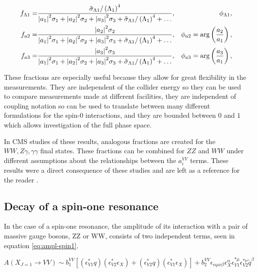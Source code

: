 \begin{equation}\begin{aligned}
f_{\Lambda1} =& \frac{\tilde{\sigma}_{\Lambda1}/\left(\Lambda_{1}\right)^{4}}{\abs{a_1}^2 \sigma_{1} + \abs{a_2}^2 \sigma_{2} + \abs{a_3}^2 \sigma_{3} + \tilde{\sigma}_{\Lambda{1}}/\left(\Lambda_{1}\right)^{4} +\ldots}, &\phi_{\Lambda1}, \\
f_{a2} =& \frac{\abs{a_2}^2 \sigma_{2}}{\abs{a_1}^2 \sigma_{1} + \abs{a_2}^2 \sigma_{2} + \abs{a_3}^2 \sigma_{3} + \tilde{\sigma}_{\Lambda{1}}/\left(\Lambda_{1}\right)^{4} +\ldots}, &\phi_{a2} = \text{arg}\left(\frac{a_{2}}{a_{1}}\right), \\
f_{a3} =& \frac{\abs{a_3}^2 \sigma_{3}}{\abs{a_1}^2 \sigma_{1} + \abs{a_2}^2 \sigma_{2} + \abs{a_3}^2 \sigma_{3} + \tilde{\sigma}_{\Lambda{1}}/\left(\Lambda_{1}\right)^{4} +\ldots}, &\phi_{a3} = \text{arg}\left(\frac{a_{3}}{a_{1}}\right),
\label{eq:fa_definitions}
\end{aligned}\end{equation}


These fractions are especially useful because they allow for great flexibility in the measurements. They are independent of the collider energy so they can be used to compare measurements made at different facilities, they are independent of coupling notation so can be used to translate between many different formulations for the spin-0 interactions, and they are bounded between $0$ and $1$ which allows investigation of the full phase space. 

In CMS studies of these results, analogous fractions are created for the $WW, Z\gamma, \gamma\gamma$ final states. These fractions can be combined for $ZZ$ and $WW$ under different assumptions about the relationships between the $a_{i}^{VV}$ terms. These results were a direct consequence of these studies and are left as a reference for the reader \cite{Khachatryan:2014kca}. 

\subsection{Decay of a spin-one resonance}
\label{sec:Spin1_Pheno}

In the case of a spin-one resonance, the amplitude of its interaction with a pair of massive gauge bosons, ZZ or WW, consists of two independent terms, seen in equation \eqref{eq:ampl-spin1}.

\begin{equation}
A(X_{J=1} \to VV) \sim b_{1}^{VV}  \left[ \left(\epsilon_{V1}^{*}q\right)\left(\epsilon_{V2}^{*}\epsilon_{X}\right) + \left(\epsilon_{V2}^{*}q\right)\left(\epsilon_{V1}^{*}\epsilon_{X}\right) \right] + b_{2}^{VV}  \epsilon_{\alpha\mu\nu\beta}\epsilon_{X}^{\alpha}\epsilon_{V1}^{*\mu}\epsilon_{V2}^{*\nu}{\tilde q}^{\beta}
\label{eq:ampl-spin1}
\end{equation}

